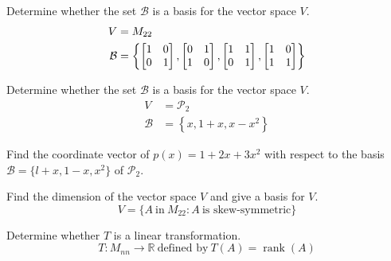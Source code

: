 \documentclass[oneperpage]{gsypset}
\DeclareMathOperator{\rank}{rank}
\begin{document}
	\begin{problem}[6.2.20]
		Determine whether the set $\mathcal{B}$ is a basis for the vector space $V$.
		\begin{align*}
			V &= M_{22} \\
			\mathcal{B} &= \left\{
					\begin{bmatrix}1&0\\0&1\end{bmatrix},
					\begin{bmatrix}0&1\\1&0\end{bmatrix},
					\begin{bmatrix}1&1\\0&1\end{bmatrix},
					\begin{bmatrix}1&0\\1&1\end{bmatrix}
				\right\}
		\end{align*}
	\end{problem}
	\begin{solution}
		
	\end{solution}
	
	\begin{problem}[6.2.25]
		Determine whether the set $\mathcal{B}$ is a basis for the vector space $V$.
		\begin{align*}
			V &= \mathscr{P}_2 \\
			\mathcal{B} &= \left\{
					x,
					1+x,
					x-x^2
				\right\}
		\end{align*}
	\end{problem}
	\begin{solution}
		
	\end{solution}
	
	\begin{problem}[6.2.28]
		Find the coordinate vector of $p(x) = 1 + 2x + 3x^2$ with respect to the basis 
		$\mathcal{B}=\{l+x,1-x,x^2\}$ of $\mathscr{P}_2$.
	\end{problem}
	\begin{solution}
		
	\end{solution}
	
	\begin{problem}[6.2.38]
		Find the dimension of the vector space $V$ and give a basis for $V$.
		\[
			V = \{A\ \text{in}\ M_{22} \colon A\ \text{is skew-symmetric}\}
		\]
	\end{problem}
	\begin{solution}
		
	\end{solution}
	
	\begin{problem}[6.3.7]
		Determine whether $T$ is a linear transformation.
		\[
			T \colon M_{nn} \to \mathbb{R}\ \text{defined by}\ T(A) = \rank(A)
		\]
	\end{problem}
	\begin{solution}
		
	\end{solution}
	
\end{document}
